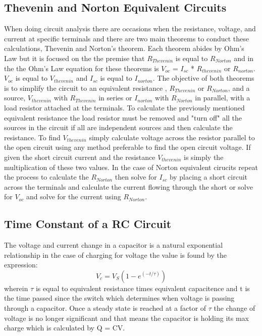 \documentclass[a4paper]{article}
\begin{document}
\subsection{Thevenin and Norton Equivalent Circuits}
When doing circuit analysis there are occasions when the resistance, voltage, and current at specific terminals and there are two main theorems to conduct these calculations, Thevenin and Norton's theorem. Each theorem abides by Ohm's Law but it is 
focused on the the premise that $R_{Thevenin}$ is equal to $R_{Norton}$ and in the the Ohm's Law equation for these theorems is $V_{oc}$ = $I_{sc}$ * $R_{thevenin}$ or $R_{norton}$. $V_{oc}$ is equal to $V_{thevenin}$ and $I_{sc}$ is equal to $I_{norton}$.
The objective of both theorems is to simplify the circuit to an equivalent resistance , $R_{Thevenin}$ or $R_{Norton}$, and a source, $V_{thevenin}$ with $R_{Thevenin}$ in series or $I_{norton}$ with $R_{Norton}$ in parallel, with a load resistor attached at the terminals. To calculate the previously mentioned equivalent resistance the load resistor must be removed and
"turn off" all the sources in the circuit if all are independent sources and then calculate the resistance. To find $V_{thevenin}$ simply calculate voltage across the resistor parallel to the open circuit using any method preferable to find the open circuit voltage. If given the short circuit current and the resistance $V_{thevenin}$ is simply the multiplication
of these two values. In the case of Norton equivalent cirucits repeat the process to calculate the $R_{Norton}$ then solve for $I_{sc}$ by placing a short circuit across the terminals and calculate the current flowing through the short or solve for $V_{oc}$ and solve for the current using $R_{Norton}$.    

\subsection{Time Constant of a RC Circuit}

The voltage and current change in a capacitor is a natural exponential relationship in the case of charging for voltage the value is found by the expression:
\[V_{c} = V_{S}(1-e^(-t/\tau))\]
wherein $\tau$ is equal to equivalent resistance times equivalent capacitence and t is the time passed since the switch which determines when voltage is passing through a capacitor.
Once a steady state is reached at a factor of $\tau$ the change of voltage is no longer significant and that means the capacitor is holding its max charge which is calculated by Q = CV.  
\pagebreak
\end{document}
